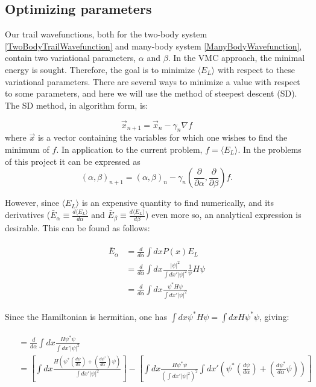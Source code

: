 \documentclass[english, a4paper]{article}
\newcommand\lr[1]{\left(#1\right)}
\begin{document}
	
	
	\subsection{Optimizing parameters}
	Our trail wavefunctions, both for the two-body system \eqref{TwoBodyTrailWavefunction} and many-body system \eqref{ManyBodyWavefunction}, contain two variational parameters, $\alpha$ and $\beta$.
	In the VMC approach, the minimal energy is sought. Therefore, the goal is to minimize $\langle E_L\rangle$ with respect to these variational parameters.
	There are several ways to minimize a value with respect to some parameters, and here we will use the method of steepest descent (SD). The SD method, in algorithm form, is:
	
	\begin{equation}
		\vec{x}_{n+1} = \vec{x}_n - \gamma_n\nabla f
	\end{equation}
	where $\vec{x}$ is a vector containing the variables for which one wishes to find the minimum of $f$. In application to the current problem, $f = \langle E_L\rangle$. In the problems of this project it can be expressed as
	\begin{equation}
	\lr{\alpha, \beta}_{n+1} = \lr{\alpha, \beta}_n - \gamma_n(\frac{\partial}{\partial \alpha}, \frac{\partial}{\partial \beta}) f.
	\end{equation}
	
	 However, since $\langle E_L\rangle$ is an expensive quantity to find numerically, and its derivatives ($\bar{E}_\alpha \equiv \frac{d\langle E_L\rangle}{d\alpha}$ and $\bar{E}_\beta \equiv \frac{d\langle E_L\rangle}{d\beta}$) even more so, an analytical expression is desirable. This can be found as follows:
	
	\begin{align}
	\begin{split}
	\bar{E}_\alpha &= \frac{d}{d\alpha}\int dx P(x) E_L\\
	&= \frac{d}{d\alpha}\int dx \frac{|\psi|^2}{\int dx'|\psi|^2}\frac{1}{\psi}H\psi\\
	&= \frac{d}{d\alpha}\int dx \frac{\psi^*H\psi}{\int dx'|\psi|^2}
	\end{split}
	\end{align}
	
	Since the Hamiltonian is hermitian, one has $\int dx\psi^* H \psi = \int dx H\psi^*\psi$, giving:
	
	\begin{align}
	\begin{split}
	&= \frac{d}{d\alpha}\int dx \frac{H\psi^*\psi}{\int dx'|\psi|^2}\\
	&= \left[ \int dx\frac{H\left(\psi^*\left(\frac{d\psi}{d\alpha}\right) + \left(\frac{d\psi^*}{d\alpha}\right)\psi\right)}{\int dx'|\psi|^2} \right] - \left[ \int dx \frac{H\psi^*\psi}{\left(\int dx'|\psi|^2\right)^2}\int dx'\left( \psi^*\left(\frac{d\psi}{d\alpha}\right) + \left(\frac{d\psi^*}{d\alpha}\psi\right) \right) \right]
	\end{split}
	\end{align}
	
\end{document}
